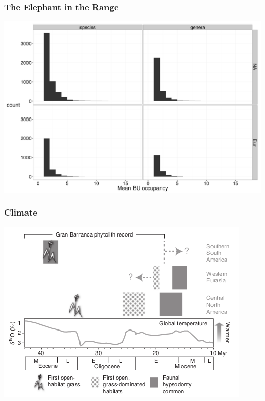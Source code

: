 \documentclass{beamer}
\begin{document}
\begin{frame}
  \frametitle{The Elephant in the Range}

  \includegraphics[height=0.8\textheight,width=\textwidth,keepaspectratio=true]{figure/occ_dist}

\end{frame}

\begin{frame}
  \frametitle{Climate}

  \includegraphics[height=0.8\textheight,width=\textwidth,keepaspectratio=true]{figure/stromberg}

  \tiny{}
\end{frame}
\end{document}
